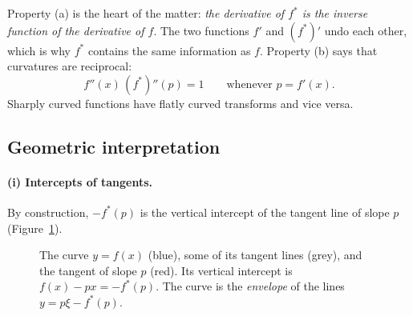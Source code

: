 Property (a) is the heart of the matter: \emph{the derivative of $f^*$ is the
inverse function of the derivative of $f$}.  The two functions $f'$ and
$(f^*)'$ undo each other, which is why $f^*$ contains the same information as
$f$.  Property (b) says that curvatures are reciprocal:
\[
  f''(x)\,(f^*)''(p)=1\qquad\text{whenever } p=f'(x).
\]
Sharply curved functions have flatly curved transforms and vice versa.

\subsection{Geometric interpretation}\label{sec:geometry}

\paragraph{(i) Intercepts of tangents.}
By construction, $-f^*(p)$ is the vertical intercept of the tangent line of
slope $p$ (Figure~\ref{fig:tangent}).

\begin{figure}[ht]
\centering
{}
\caption{The curve $y=f(x)$ (blue), some of its tangent lines (grey), and the
tangent of slope $p$ (red).  Its vertical intercept is $f(x)-px=-f^*(p)$.  The
curve is the \emph{envelope} of the lines $y=p\xi-f^*(p)$.}
\label{fig:tangent}
\end{figure}

